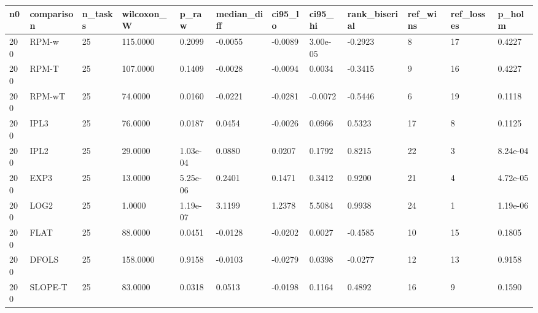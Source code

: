 \begin{tabular}{llllllllllll}
\hline
n0 & comparison & n\_tasks & wilcoxon\_W & p\_raw & median\_diff & ci95\_lo & ci95\_hi & rank\_biserial & ref\_wins & ref\_losses & p\_holm \\
\hline
200 & RPM-w & 25 & 115.0000 & 0.2099 & -0.0055 & -0.0089 & 3.00e-05 & -0.2923 & 8 & 17 & 0.4227 \\
200 & RPM-T & 25 & 107.0000 & 0.1409 & -0.0028 & -0.0094 & 0.0034 & -0.3415 & 9 & 16 & 0.4227 \\
200 & RPM-wT & 25 & 74.0000 & 0.0160 & -0.0221 & -0.0281 & -0.0072 & -0.5446 & 6 & 19 & 0.1118 \\
200 & IPL3 & 25 & 76.0000 & 0.0187 & 0.0454 & -0.0026 & 0.0966 & 0.5323 & 17 & 8 & 0.1125 \\
200 & IPL2 & 25 & 29.0000 & 1.03e-04 & 0.0880 & 0.0207 & 0.1792 & 0.8215 & 22 & 3 & 8.24e-04 \\
200 & EXP3 & 25 & 13.0000 & 5.25e-06 & 0.2401 & 0.1471 & 0.3412 & 0.9200 & 21 & 4 & 4.72e-05 \\
200 & LOG2 & 25 & 1.0000 & 1.19e-07 & 3.1199 & 1.2378 & 5.5084 & 0.9938 & 24 & 1 & 1.19e-06 \\
200 & FLAT & 25 & 88.0000 & 0.0451 & -0.0128 & -0.0202 & 0.0027 & -0.4585 & 10 & 15 & 0.1805 \\
200 & DFOLS & 25 & 158.0000 & 0.9158 & -0.0103 & -0.0279 & 0.0398 & -0.0277 & 12 & 13 & 0.9158 \\
200 & SLOPE-T & 25 & 83.0000 & 0.0318 & 0.0513 & -0.0198 & 0.1164 & 0.4892 & 16 & 9 & 0.1590 \\
\hline
\end{tabular}

